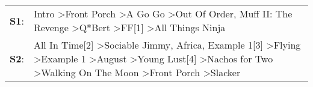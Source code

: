\begin{supertabular}{p{0.03\textwidth}p{0.92\textwidth}}
 \textbf{S1}:  &                                                                                                                                                                                                           Intro\textsuperscript{} \textgreater \enspace Front Porch\textsuperscript{} \textgreater \enspace A Go Go\textsuperscript{} \textgreater \enspace Out Of Order\textsuperscript{}, \enspace Muff II: The Revenge\textsuperscript{} \textgreater \enspace Q*Bert\textsuperscript{} \textgreater \enspace FF[1]\textsuperscript{} \textgreater \enspace All Things Ninja\textsuperscript{}  \enspace  \\
 \textbf{S2}:  &  All In Time[2]\textsuperscript{} \textgreater \enspace Sociable Jimmy\textsuperscript{}, \enspace Africa\textsuperscript{}, \enspace Example 1[3]\textsuperscript{} \textgreater \enspace Flying\textsuperscript{} \textgreater \enspace Example 1\textsuperscript{} \textgreater \enspace August\textsuperscript{} \textgreater \enspace Young Lust[4]\textsuperscript{} \textgreater \enspace Nachos for Two\textsuperscript{} \textgreater \enspace Walking On The Moon\textsuperscript{} \textgreater \enspace Front Porch\textsuperscript{} \textgreater \enspace Slacker\textsuperscript{}  \enspace  \\
\end{supertabular}
